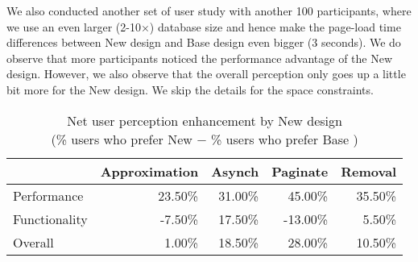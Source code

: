 We also conducted another set of user study with another 100 participants,
where we use an even larger (2-10$\times$) database size   and hence make the page-load time
differences between New design and Base design even bigger (3 seconds).
We do observe that more participants noticed the performance advantage
of the New design. However, we also observe that the overall perception
only goes up a little bit more for the New design. We skip the details for
the space constraints.



\begin{table}[]

\centering
\caption{Net user perception enhancement by New design\\ (\% users 
who prefer New   $-$ \% users who prefer Base )}
\label{tab:userstudy_diff}
\begin{tabular}{@{}lrrrr@{}}
\toprule
                                & Approximation & Asynch & Paginate & Removal  \\ \midrule
Performance       & 23.50\%       & 31.00\%      & 45.00\%  & 35.50\% \\ 
Functionality  & -7.50\%       & 17.50\%      & -13.00\% & 5.50\%  \\ 
Overall   & 1.00\%        & 18.50\%      & 28.00\%  & 10.50\% \\  
 \bottomrule
\end{tabular}
 \vspace{-0.2in}
\end{table}


